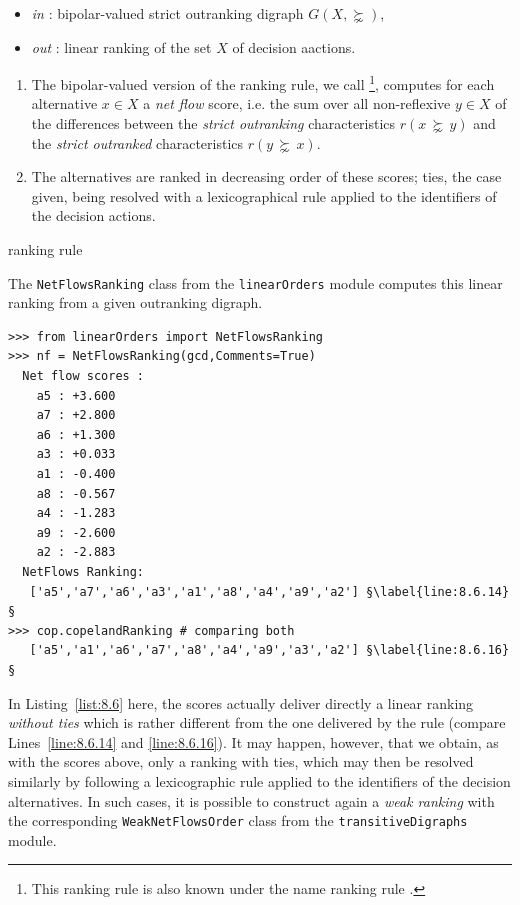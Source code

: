 \begin{algorithm}
  {\footnotesize
\begin{itemize}
 \item [] \emph{in} : bipolar-valued strict outranking digraph $G(X,\succnsim)$,
 \item [] \emph{out} : linear ranking of the set $X$ of decision aactions.
\end{itemize}
  \begin{enumerate}
  \item The bipolar-valued version of the \Copeland ranking rule, we call \NetFlows \footnote{This ranking rule is also known under the name \Promethee ranking rule \citep*{BRA-1985}.}, computes for each alternative $x \in X$ a \emph{net flow} score,  i.e. the sum over all non-reflexive $y \in X$ of the differences between the \emph{strict outranking} characteristics $r(x\, \succnsim \,y)$ and the \emph{strict outranked} characteristics $r(y\, \succnsim \,x)$.
  \item  The alternatives are ranked in decreasing order of these \NetFlows scores; ties, the case given, being resolved with a lexicographical rule applied to the identifiers of the decision actions.
  \end{enumerate}
}
\caption{\NetFlows ranking rule}
\label{alg:8.2}
\end{algorithm}

The \texttt{NetFlowsRanking} class from the \texttt{linearOrders} module computes this linear ranking from a given outranking digraph.
\begin{lstlisting}[caption={Computing a \NetFlows ranking},label=list:8.6]
>>> from linearOrders import NetFlowsRanking
>>> nf = NetFlowsRanking(gcd,Comments=True)
  Net flow scores :
    a5 : +3.600
    a7 : +2.800
    a6 : +1.300
    a3 : +0.033
    a1 : -0.400
    a8 : -0.567
    a4 : -1.283
    a9 : -2.600
    a2 : -2.883
  NetFlows Ranking:
   ['a5','a7','a6','a3','a1','a8','a4','a9','a2'] §\label{line:8.6.14}§
>>> cop.copelandRanking # comparing both
   ['a5','a1','a6','a7','a8','a4','a9','a3','a2'] §\label{line:8.6.16}§
\end{lstlisting}

In Listing~\vref{list:8.6} here, the \NetFlows scores actually deliver directly a linear ranking \emph{without ties} which is rather different from the one delivered by the \Copeland rule (compare Lines~\ref{line:8.6.14} and \ref{line:8.6.16}). It may happen, however, that we obtain, as with the \Copeland scores above, only a ranking with ties, which may then be resolved similarly by following a lexicographic rule applied to the identifiers of the decision alternatives. In such cases, it is possible to construct again a \emph{weak ranking} with the corresponding \texttt{WeakNetFlowsOrder} class from the \texttt{transitiveDigraphs} module.

